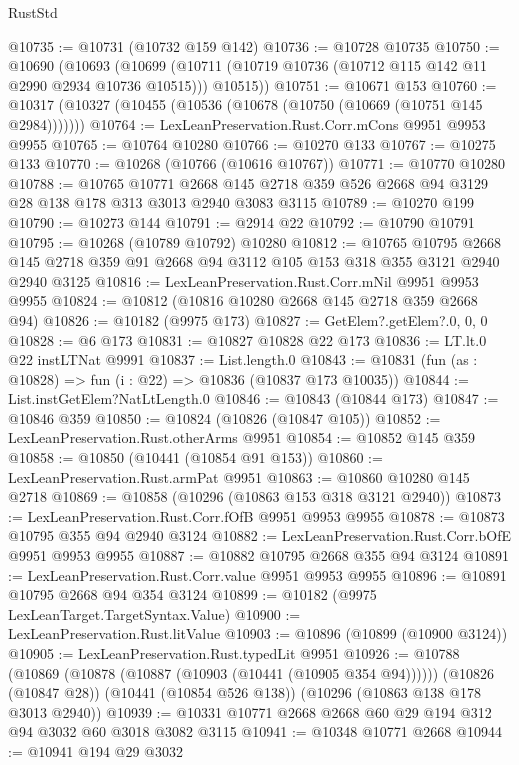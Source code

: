\begin{lexlean}{RustStd}
\begin{coremodule}
@10735 := @10731 (@10732 @159 @142)
@10736 := @10728 @10735
@10750 := @10690
    (@10693
      (@10699 (@10711 (@10719 @10736 (@10712 @115 @142 @11 @2990 @2934 @10736 @10515))) @10515))
@10751 := @10671 @153
@10760 := @10317 (@10327 (@10455 (@10536 (@10678 (@10750 (@10669 (@10751 @145 @2984)))))))
@10764 := LexLeanPreservation.Rust.Corr.mCons @9951 @9953 @9955
@10765 := @10764 @10280
@10766 := @10270 @133
@10767 := @10275 @133
@10770 := @10268 (@10766 (@10616 @10767))
@10771 := @10770 @10280
@10788 := @10765
    @10771
    @2668
    @145
    @2718
    @359
    @526
    @2668
    @94
    @3129
    @28
    @138
    @178
    @313
    @3013
    @2940
    @3083
    @3115
@10789 := @10270 @199
@10790 := @10273 @144
@10791 := @2914 @22
@10792 := @10790 @10791
@10795 := @10268 (@10789 @10792) @10280
@10812 := @10765
    @10795
    @2668
    @145
    @2718
    @359
    @91
    @2668
    @94
    @3112
    @105
    @153
    @318
    @355
    @3121
    @2940
    @2940
    @3125
@10816 := LexLeanPreservation.Rust.Corr.mNil @9951 @9953 @9955
@10824 := @10812 (@10816 @10280 @2668 @145 @2718 @359 @2668 @94)
@10826 := @10182 (@9975 @173)
@10827 := GetElem?.getElem?.{0, 0, 0}
@10828 := @6 @173
@10831 := @10827 @10828 @22 @173
@10836 := LT.lt.{0} @22 instLTNat @9991
@10837 := List.length.{0}
@10843 := @10831 (fun (as : @10828) => fun (i : @22) => @10836 (@10837 @173 @10035))
@10844 := List.instGetElem?NatLtLength.{0}
@10846 := @10843 (@10844 @173)
@10847 := @10846 @359
@10850 := @10824 (@10826 (@10847 @105))
@10852 := LexLeanPreservation.Rust.otherArms @9951
@10854 := @10852 @145 @359
@10858 := @10850 (@10441 (@10854 @91 @153))
@10860 := LexLeanPreservation.Rust.armPat @9951
@10863 := @10860 @10280 @145 @2718
@10869 := @10858 (@10296 (@10863 @153 @318 @3121 @2940))
@10873 := LexLeanPreservation.Rust.Corr.fOfB @9951 @9953 @9955
@10878 := @10873 @10795 @355 @94 @2940 @3124
@10882 := LexLeanPreservation.Rust.Corr.bOfE @9951 @9953 @9955
@10887 := @10882 @10795 @2668 @355 @94 @3124
@10891 := LexLeanPreservation.Rust.Corr.value @9951 @9953 @9955
@10896 := @10891 @10795 @2668 @94 @354 @3124
@10899 := @10182 (@9975 LexLeanTarget.TargetSyntax.Value)
@10900 := LexLeanPreservation.Rust.litValue
@10903 := @10896 (@10899 (@10900 @3124))
@10905 := LexLeanPreservation.Rust.typedLit @9951
@10926 := @10788
    (@10869 (@10878 (@10887 (@10903 (@10441 (@10905 @354 @94))))))
    (@10826 (@10847 @28))
    (@10441 (@10854 @526 @138))
    (@10296 (@10863 @138 @178 @3013 @2940))
@10939 := @10331 @10771 @2668 @2668 @60 @29 @194 @312 @94 @3032 @60 @3018 @3082 @3115
@10941 := @10348 @10771 @2668
@10944 := @10941 @194 @29 @3032

\end{coremodule}
\end{lexlean}
